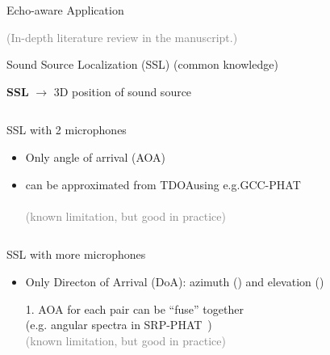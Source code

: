 \begin{frame}[t]{Echo-aware Application \hfill\faBook}
    \begin{center}
        \textcolor{gray}{\small (In-depth literature review in the manuscript.)}
    \end{center}
\end{frame}

\begin{frame}{Sound Source Localization (SSL) {\hfill\small (common knowledge)} \faBook}

    \textbf{SSL} $\to$ 3D position of sound source

    \begin{columns}[T,onlytextwidth]
        \begin{block}{SSL with 2 microphones}
            \begin{itemize}
                \item Only angle of arrival (\alert{AOA})\iconAOA
                \item can be approximated from \alert{TDOA}using e.g.GCC-PHAT
                \\\cite{knapp1976generalized}
                \\\textcolor{gray}{\small (known limitation, but good in practice)}
            \end{itemize}
        \end{block}
    \end{columns}
    \pause

    \begin{columns}[T,onlytextwidth]
        \begin{block}{SSL with more microphones}
            \begin{itemize}
                \item Only Directon of Arrival (DoA):  azimuth (\faArrowsAltH) and elevation (\faArrowsAltV)
                \item[1.] AOA for each pair can be ``fuse''  together
                \\(e.g. angular spectra in SRP-PHAT~\cite{dibiase2001robust})
                \\\textcolor{gray}{\small (known limitation, but good in practice)}
            \end{itemize}
        \end{block}
    \end{columns}

\end{frame}

